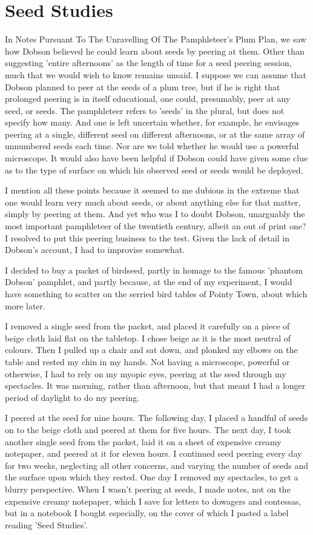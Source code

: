 \chapter{Seed Studies}

In Notes Pursuant To The Unravelling Of The Pamphleteer's Plum Plan, we saw how Dobson believed he could learn about seeds by peering at them. Other than suggesting 'entire afternoons' as the length of time for a seed peering session, much that we would wish to know remains unsaid. I suppose we can assume that Dobson planned to peer at the seeds of a plum tree, but if he is right that prolonged peering is in itself educational, one could, presumably, peer at any seed, or seeds. The pamphleteer refers to 'seeds' in the plural, but does not specify how many. And one is left uncertain whether, for example, he envisages peering at a single, different seed on different afternoons, or at the same array of unnumbered seeds each time. Nor are we told whether he would use a powerful microscope. It would also have been helpful if Dobson could have given some clue as to the type of surface on which his observed seed or seeds would be deployed.

I mention all these points because it seemed to me dubious in the extreme that one would learn very much about seeds, or about anything else for that matter, simply by peering at them. And yet who was I to doubt Dobson, unarguably the most important pamphleteer of the twentieth century, albeit an out of print one? I resolved to put this peering business to the test. Given the lack of detail in Dobson's account, I had to improvise somewhat.

I decided to buy a packet of birdseed, partly in homage to the famous 'phantom Dobson' pamphlet, and partly because, at the end of my experiment, I would have something to scatter on the serried bird tables of Pointy Town, about which more later.

I removed a single seed from the packet, and placed it carefully on a piece of beige cloth laid flat on the tabletop. I chose beige as it is the most neutral of colours. Then I pulled up a chair and sat down, and plonked my elbows on the table and rested my chin in my hands. Not having a microscope, powerful or otherwise, I had to rely on my myopic eyes, peering at the seed through my spectacles. It was morning, rather than afternoon, but that meant I had a longer period of daylight to do my peering.

I peered at the seed for nine hours. The following day, I placed a handful of seeds on to the beige cloth and peered at them for five hours. The next day, I took another single seed from the packet, laid it on a sheet of expensive creamy notepaper, and peered at it for eleven hours. I continued seed peering every day for two weeks, neglecting all other concerns, and varying the number of seeds and the surface upon which they rested. One day I removed my spectacles, to get a blurry perspective. When I wasn't peering at seeds, I made notes, not on the expensive creamy notepaper, which I save for letters to dowagers and contessas, but in a notebook I bought especially, on the cover of which I pasted a label reading 'Seed Studies'.

